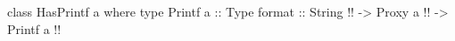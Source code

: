 \begin{code}
class HasPrintf a where
  type Printf a :: Type
  format :: String    !!
         -> Proxy a   !!
         -> Printf a  !!
\end{code}

